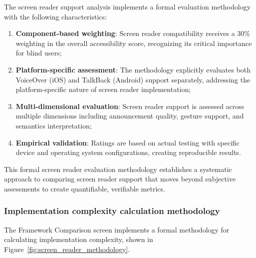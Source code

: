 The screen reader support analysis implements a formal evaluation methodology with the following characteristics:

\begin{enumerate}
    \item \textbf{Component-based weighting}: Screen reader compatibility receives a 30\% weighting in the overall accessibility score, recognizing its critical importance for blind users;
    
    \item \textbf{Platform-specific assessment}: The methodology explicitly evaluates both VoiceOver (iOS) and TalkBack (Android) support separately, addressing the platform-specific nature of screen reader implementation;
    
    \item \textbf{Multi-dimensional evaluation}: Screen reader support is assessed across multiple dimensions including announcement quality, gesture support, and semantics interpretation;
    
    \item \textbf{Empirical validation}: Ratings are based on actual testing with specific device and operating system configurations, creating reproducible results.
\end{enumerate}

This formal screen reader evaluation methodology establishes a systematic approach to comparing screen reader support that moves beyond subjective assessments to create quantifiable, verifiable metrics.

\subsubsection{Implementation complexity calculation methodology}

The Framework Comparison screen implements a formal methodology for calculating implementation complexity, shown in Figure~\ref{fig:screen_reader_methodology}.

